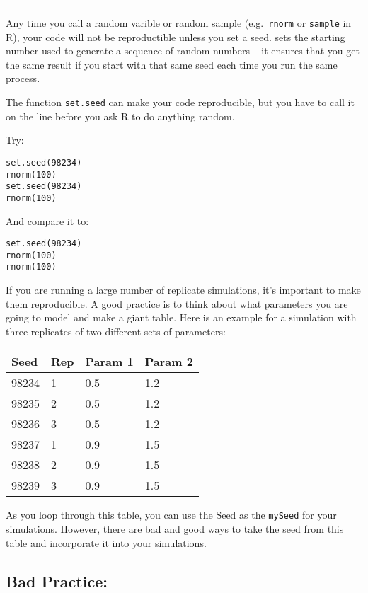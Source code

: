 \documentclass[
  letterpaper,
  DIV=11,
  numbers=noendperiod]{scrreprt}
\begin{document}
\begin{center}\rule{0.5\linewidth}{0.5pt}\end{center}

Any time you call a random varible or random sample (e.g.~\texttt{rnorm}
or \texttt{sample} in R), your code will not be reproductible unless you
set a seed. sets the starting number used to generate a sequence of
random numbers -- it ensures that you get the same result if you start
with that same seed each time you run the same process.

The function \texttt{set.seed} can make your code reproducible, but you
have to call it on the line before you ask R to do anything random.

Try:

\begin{verbatim}
set.seed(98234)
rnorm(100)
set.seed(98234)
rnorm(100)
\end{verbatim}

And compare it to:

\begin{verbatim}
set.seed(98234)
rnorm(100)
rnorm(100)
\end{verbatim}

If you are running a large number of replicate simulations, it's
important to make them reproducible. A good practice is to think about
what parameters you are going to model and make a giant table. Here is
an example for a simulation with three replicates of two different sets
of parameters:

\begin{longtable}[]{@{}llll@{}}
\toprule()
\textbf{Seed} & \textbf{Rep} & \textbf{Param 1} & \textbf{Param 2} \\
\midrule()
\endhead
98234 & 1 & 0.5 & 1.2 \\
98235 & 2 & 0.5 & 1.2 \\
98236 & 3 & 0.5 & 1.2 \\
98237 & 1 & 0.9 & 1.5 \\
98238 & 2 & 0.9 & 1.5 \\
98239 & 3 & 0.9 & 1.5 \\
\bottomrule()
\end{longtable}

As you loop through this table, you can use the Seed as the
\texttt{mySeed} for your simulations. However, there are bad and good
ways to take the seed from this table and incorporate it into your
simulations.

\hypertarget{bad-practice}{%
\subsection*{\texorpdfstring{\textbf{Bad
Practice:}}{Bad Practice:}}\label{bad-practice}}
\end{document}
